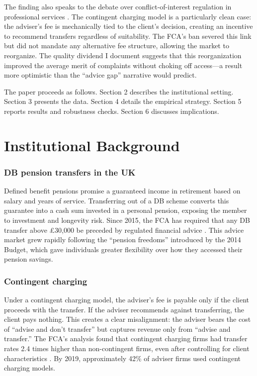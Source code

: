 \documentclass[12pt]{article}
\begin{document}
The finding also speaks to the debate over conflict-of-interest regulation in professional services \citep{loewenstein2011, duflo2011, malmendier2007}. The contingent charging model is a particularly clean case: the adviser's fee is mechanically tied to the client's decision, creating an incentive to recommend transfers regardless of suitability. The FCA's ban severed this link but did not mandate any alternative fee structure, allowing the market to reorganize. The quality dividend I document suggests that this reorganization improved the average merit of complaints without choking off access---a result more optimistic than the ``advice gap'' narrative would predict.

The paper proceeds as follows. Section 2 describes the institutional setting. Section 3 presents the data. Section 4 details the empirical strategy. Section 5 reports results and robustness checks. Section 6 discusses implications.


\section{Institutional Background}

\subsubsection*{DB pension transfers in the UK} Defined benefit pensions promise a guaranteed income in retirement based on salary and years of service. Transferring out of a DB scheme converts this guarantee into a cash sum invested in a personal pension, exposing the member to investment and longevity risk. Since 2015, the FCA has required that any DB transfer above \pounds30,000 be preceded by regulated financial advice \citep{fca2015pension}. This advice market grew rapidly following the ``pension freedoms'' introduced by the 2014 Budget, which gave individuals greater flexibility over how they accessed their pension savings.

\subsubsection*{Contingent charging} Under a contingent charging model, the adviser's fee is payable only if the client proceeds with the transfer. If the adviser recommends against transferring, the client pays nothing. This creates a clear misalignment: the adviser bears the cost of ``advise and don't transfer'' but captures revenue only from ``advise and transfer.'' The FCA's analysis found that contingent charging firms had transfer rates 2.4 times higher than non-contingent firms, even after controlling for client characteristics \citep{fca2020ps206}. By 2019, approximately 42\% of adviser firms used contingent charging models.
\end{document}
